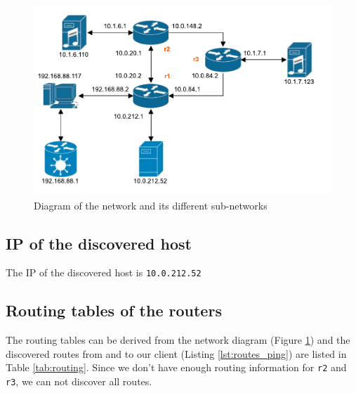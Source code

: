\documentclass[parskip=full]{scrartcl}
\begin{document}
\begin{figure}[ht]
    \centering
    \includegraphics[width=\textwidth]{network_layout.pdf} 
    \caption{Diagram of the network and its different sub-networks}
    \label{fig:networkLayout}
\end{figure}

\subsection{IP of the discovered host}
The IP of the discovered host is \texttt{10.0.212.52}

\subsection{Routing tables of the routers}
The routing tables can be derived from the network diagram (Figure \ref{fig:networkLayout}) and the discovered routes from and to our client (Listing \ref{lst:routes_ping}) are listed in Table \ref{tab:routing}.
Since we don't have enough routing information for \texttt{r2} and \texttt{r3}, we can not discover all routes.
\end{document}
